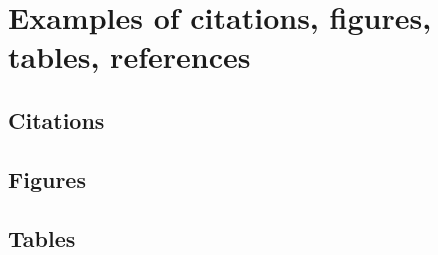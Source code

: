 \documentclass{article}
\begin{document}
%


\section{Examples of citations, figures, tables, references}

\subsection{Citations}


\subsection{Figures}


\subsection{Tables}
\end{document}
